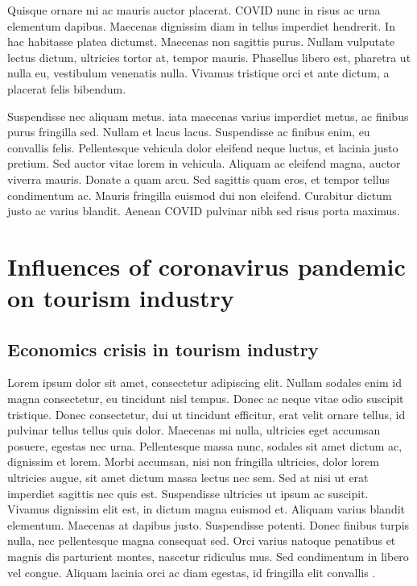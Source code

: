 \documentclass[draft=false
              ,paper=a4
              ,twoside=false
              ,fontsize=12pt
              ,headsepline
              ,BCOR10mm
              ,DIV11
              ]{article}
\begin{document}
Quisque ornare mi ac mauris auctor placerat. \gls{COVID} nunc in risus ac urna elementum dapibus. Maecenas dignissim diam in tellus imperdiet hendrerit. In hac habitasse platea dictumst. Maecenas non sagittis purus. Nullam vulputate lectus dictum, ultricies tortor at, tempor mauris. Phasellus libero est, pharetra ut nulla eu, vestibulum venenatis nulla. Vivamus tristique orci et ante dictum, a placerat felis bibendum.

Suspendisse nec aliquam metus. \gls{iata} maecenas varius imperdiet metus, ac finibus purus fringilla sed. Nullam et lacus lacus. Suspendisse ac finibus enim, eu convallis felis. Pellentesque vehicula dolor eleifend neque luctus, et lacinia justo pretium. Sed auctor vitae lorem in vehicula. Aliquam ac eleifend magna, auctor viverra mauris. Donate a quam arcu. Sed sagittis quam eros, et tempor tellus condimentum ac. Mauris fringilla euismod dui non eleifend. Curabitur dictum justo ac varius blandit. Aenean \gls{COVID} pulvinar nibh sed risus porta maximus.

\vspace{12pt}
\section{Influences of coronavirus pandemic on tourism industry}
\vspace{6pt}
\subsection{Economics crisis in tourism industry}
\vspace{6pt}

Lorem ipsum dolor sit amet, consectetur adipiscing elit. Nullam sodales enim id magna consectetur, eu tincidunt nisl tempus. Donec ac neque vitae odio suscipit tristique. Donec consectetur, dui ut tincidunt efficitur, erat velit ornare tellus, id pulvinar tellus tellus quis dolor. Maecenas mi nulla, ultricies eget accumsan posuere, egestas nec urna. Pellentesque massa nunc, sodales sit amet dictum ac, dignissim et lorem. Morbi accumsan, nisi non fringilla ultricies, dolor lorem ultricies augue, sit amet dictum massa lectus nec sem. Sed at nisi ut erat imperdiet sagittis nec quis est. Suspendisse ultricies ut ipsum ac suscipit. Vivamus dignissim elit est, in dictum magna euismod et. Aliquam varius blandit elementum. Maecenas at dapibus justo. Suspendisse potenti. Donec finibus turpis nulla, nec pellentesque magna consequat sed. Orci varius natoque penatibus et magnis dis parturient montes, nascetur ridiculus mus. Sed condimentum in libero vel congue. Aliquam lacinia orci ac diam egestas, id fringilla elit convallis \cite{lorem}.
\end{document}
